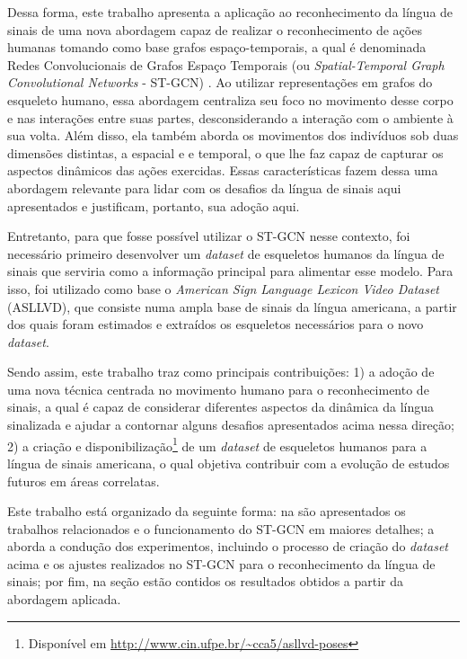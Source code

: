 Dessa forma, este trabalho apresenta a aplicação ao reconhecimento da língua de sinais de uma nova abordagem capaz de realizar o reconhecimento de ações humanas tomando como base grafos espaço-temporais, a qual é denominada Redes Convolucionais de Grafos Espaço Temporais (ou \textit{Spatial-Temporal Graph Convolutional Networks} - ST-GCN) \cite{st-gcn-2018}.
Ao utilizar representações em grafos do esqueleto humano, essa abordagem centraliza seu foco no movimento desse corpo e nas interações entre suas partes, desconsiderando a interação com o ambiente à sua volta. Além disso, ela também aborda os movimentos dos indivíduos sob duas dimensões distintas, a espacial e e temporal, o que lhe faz capaz de capturar os aspectos dinâmicos das ações exercidas. Essas características fazem dessa uma abordagem relevante para lidar com os desafios da língua de sinais aqui apresentados e justificam, portanto, sua adoção aqui.

Entretanto, para que fosse possível utilizar o ST-GCN nesse contexto, foi necessário primeiro desenvolver um \textit{dataset} de esqueletos humanos da língua de sinais que serviria como a informação principal para alimentar esse modelo. Para isso, foi utilizado como base o \textit{American Sign Language Lexicon Video Dataset} (ASLLVD), que consiste numa ampla base de sinais da língua americana, a partir dos quais foram estimados e extraídos os esqueletos necessários para o novo \textit{dataset}.

Sendo assim, este trabalho traz como principais contribuições: 1) a adoção de uma nova técnica centrada no movimento humano para o reconhecimento de sinais, a qual é capaz de considerar diferentes aspectos da dinâmica da língua sinalizada e ajudar a contornar alguns desafios apresentados acima nessa direção; 2) a criação e disponibilização\footnote{
    Disponível em \url{http://www.cin.ufpe.br/~cca5/asllvd-poses}
} de um \textit{dataset} de esqueletos humanos para a língua de sinais americana, o qual objetiva contribuir com a evolução de estudos futuros em áreas correlatas.

Este trabalho está organizado da seguinte forma: na  são apresentados os trabalhos relacionados e o funcionamento do ST-GCN em maiores detalhes; a  aborda a condução dos experimentos, incluindo o processo de criação do \textit{dataset} acima e os ajustes realizados no ST-GCN para o reconhecimento da língua de sinais; por fim, na seção  estão contidos os resultados obtidos a partir da abordagem aplicada.



